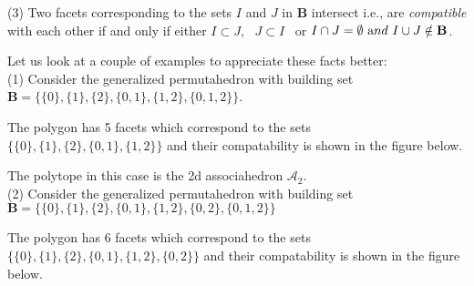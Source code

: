 \documentclass[hidelinks,12pt]{article}
\begin{document}
(3) Two facets corresponding to the sets $I$ and $J$ in ${\mathbf B}$ intersect i.e., are {\it compatible} with each other if and only if  either $I \subset J$,~ $J \subset I$~ or $I \cap J = \emptyset ~{\text and} ~ I \cup J \notin {\mathbf B}$.

Let us look at a couple of examples to appreciate these facts better:\\
(1) Consider the generalized permutahedron with building set ${\mathbf B}= \{ \{0\},\{1\},\{2\},\{0,1\},\{1,2\},\{0,1,2\} \}$.

The polygon has 5 facets which correspond to the sets $\{ \{0\},\{1\},\{2\},\{0,1\},\{1,2\}\}$ and their compatability is shown in the figure below.

The polytope in this case is the 2d associahedron ${\mathscr A_2}$.\\
(2) Consider the generalized permutahedron with building set ${\mathbf B}= \{ \{0\},\{1\},\{2\},\{0,1\},\{1,2\},\{0,2\},\{0,1,2\} \}$ 

The polygon has 6 facets which correspond to the sets $\{ \{0\},\{1\},\{2\},\{0,1\},\{1,2\},\{0,2\}\}$ and their compatability is shown in the figure below.
\end{document}
